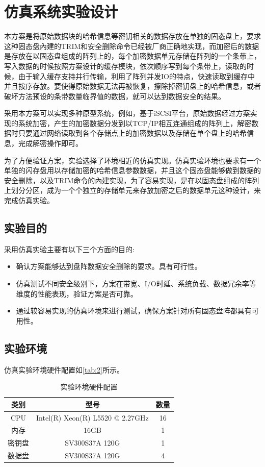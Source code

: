 \chapter{仿真系统实验设计}
本方案是将原始数据块的哈希信息等密钥相关的数据存放在单独的固态盘上，要求这种固态盘內建的TRIM和安全删除命令已经被厂商正确地实现，而加密后的数据是存放在以固态盘组成的阵列上的，每个加密数据单元存储在阵列的一个条带上，写入数据的时候按照方案设计的缓存模块，依次顺序写到每个条带上，读取的时候，由于输入缓存支持并行传输，利用了阵列并发IO的特点，快速读取到缓存中并且按序存放。要使得原始数据无法再被恢复，擦除掉密钥盘上的哈希信息，或者破坏方法预设的条带数量临界值的数据，就可以达到数据安全的结果。


采用本方案可以实现多种原型系统，例如，基于iSCSI平台，原始数据经过方案实现的系统加密，产生的加密数据分发到以TCP/IP相互连通组成的阵列上，解密数据时只要通过网络读取到各个存储点上的加密数据以及存储在单个盘上的哈希信息，完成解密操作即可。


为了方便验证方案，实验选择了环境相近的仿真实现。仿真实验环境也要求有一个单独的闪存盘用以存储加密的哈希信息参数数据，并且这个固态盘能够做到数据的安全删除，以及TRIM命令的內建实现，为了容易实现，是在以固态盘组成的阵列上划分分区，成为一个个独立的存储单元来存放加密之后的数据单元这种设计，来完成仿真实验。
\section{实验目的}
采用仿真实验主要有以下三个方面的目的:
\begin{itemize}
	\item 确认方案能够达到盘阵数据安全删除的要求。具有可行性。
	\item 仿真测试不同安全级别下，方案在带宽、I/O时延、系统负载、数据冗余率等维度的性能表现，验证方案是否可靠。
	\item 通过较容易实现的仿真环境来进行测试，确保方案针对所有固态盘阵都具有可用性。
\end{itemize}
\section{实验环境}
仿真实验环境硬件配置如\autoref{tab:2}所示。
\begin{table}[H]
    \centering
    \caption{实验环境硬件配置}
    \label{tab:2}
    \begin{tabular}{|c|c|c|}
        \hline
        类别 & 型号 & 数量 \\ \hline
        CPU & Intel(R) Xeon(R) L5520  @ 2.27GHz & 16 \\ \hline
        内存 & 16GB & 1 \\ \hline
        密钥盘 & SV300S37A 120G & 1 \\ \hline
        数据盘 & SV300S37A 120G & 4 \\ \hline
    \end{tabular}
\end{table}
